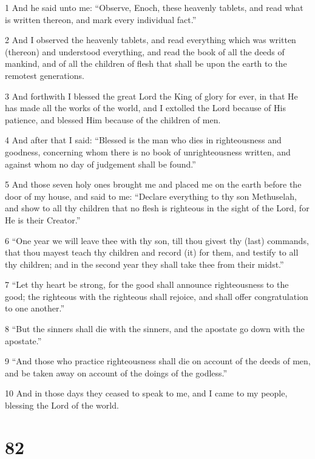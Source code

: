 \par 1 And he said unto me: “Observe, Enoch, these heavenly tablets, and read what is written thereon, and mark every individual fact.”
\par 2 And I observed the heavenly tablets, and read everything which was written (thereon) and understood everything, and read the book of all the deeds of mankind, and of all the children of flesh that shall be upon the earth to the remotest generations.
\par 3 And forthwith I blessed the great Lord the King of glory for ever, in that He has made all the works of the world, and I extolled the Lord because of His patience, and blessed Him because of the children of men.
\par 4 And after that I said: “Blessed is the man who dies in righteousness and goodness, concerning whom there is no book of unrighteousness written, and against whom no day of judgement shall be found.”
\par 5 And those seven holy ones brought me and placed me on the earth before the door of my house, and said to me: “Declare everything to thy son Methuselah, and show to all thy children that no flesh is righteous in the sight of the Lord, for He is their Creator.”
\par 6 “One year we will leave thee with thy son, till thou givest thy (last) commands, that thou mayest teach thy children and record (it) for them, and testify to all thy children; and in the second year they shall take thee from their midst.”
\par 7 “Let thy heart be strong, for the good shall announce righteousness to the good; the righteous with the righteous shall rejoice, and shall offer congratulation to one another.”
\par 8 “But the sinners shall die with the sinners, and the apostate go down with the apostate.”
\par 9 “And those who practice righteousness shall die on account of the deeds of men, and be taken away on account of the doings of the godless.”
\par 10 And in those days they ceased to speak to me, and I came to my people, blessing the Lord of the world.

\chapter{82}

